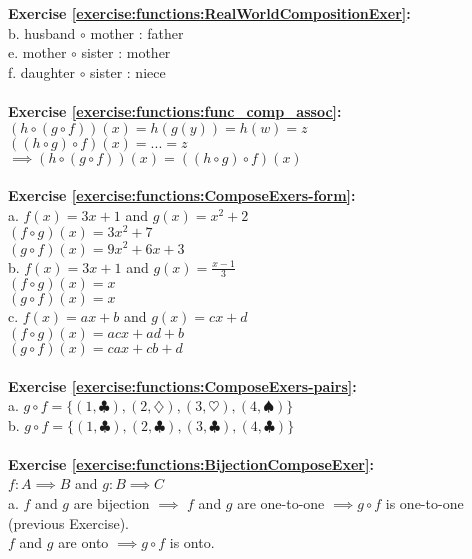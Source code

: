 \textbf{Exercise \ref{exercise:functions:RealWorldCompositionExer}:}\\
b. husband $\circ$ mother : father\\
e. mother $\circ$ sister : mother\\
f. daughter $\circ$ sister : niece\\
\\
\textbf{Exercise \ref{exercise:functions:func_comp_assoc}:}\\
$(h\circ(g\circ f))(x)=h(g(y))=h(w)=z$\\
$((h\circ g)\circ f)(x)=...=z$\\
$\implies (h\circ(g\circ f))(x)=((h\circ g)\circ f)(x)$\\
\\
\textbf{Exercise \ref{exercise:functions:ComposeExers-form}:}\\
a. $f(x)=3x+1$ and $g(x)=x^2+2$\\
$(f\circ g)(x)=3x^2+7$\\
$(g\circ f)(x)=9x^2+6x+3$\\
b. $f(x)=3x+1$ and $g(x)=\displaystyle\frac{x-1}{3}$\\
$(f\circ g)(x)=x$\\
$(g\circ f)(x)=x$\\
c. $f(x)=ax+b$ and $g(x)=cx+d$\\
$(f\circ g)(x)=acx+ad+b$\\
$(g\circ f)(x)=cax+cb+d$\\
\\
\textbf{Exercise \ref{exercise:functions:ComposeExers-pairs}:}\\
a. $g\circ f=\{(1,\clubsuit),(2,\diamondsuit),(3,\heartsuit),(4,\spadesuit)\}$\\
b. $g\circ f=\{(1,\clubsuit),(2,\clubsuit),(3,\clubsuit),(4,\clubsuit)\}$\\
\\
\textbf{Exercise \ref{exercise:functions:BijectionComposeExer}:}\\
$f: A\implies B$ and $g: B\implies C$\\
a. $f$ and $g$ are bijection $\implies$  $f$ and $g$ are one-to-one $\implies g\circ f$ is one-to-one (previous Exercise).\\
$f$ and $g$ are onto $\implies g\circ f$ is onto.\\
